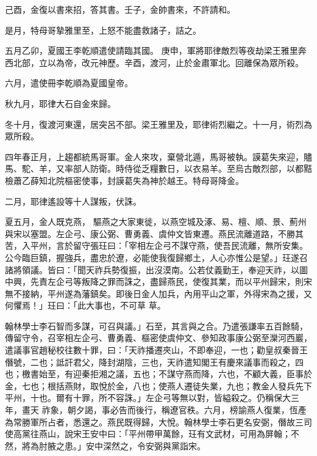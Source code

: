 \begin{pinyinscope}
 己酉，金復以書來招，答其書。壬子，金帥書來，不許請和。



 是月，特母哥摯雅里至，上怒不能盡救諸子，詰之。



 五月乙卯，夏國王李乾順遣使請臨其國。
 庚申，軍將耶律敵烈等夜劫梁王雅里奔西北部，立以為帝，改元神歷。辛酉，渡河，止於金肅軍北。回離保為眾所殺。



 六月，遣使冊李乾順為夏國皇帝。



 秋九月，耶律大石自金來歸。



 冬十月，復渡河東還，居突呂不部。梁王雅里及，耶律術烈繼之。十一月，術烈為眾所殺。



 四年春正月，上趨都統馬哥軍。金人來攻，棄營北遁，馬哥被執。謨葛失來迎，贐馬、駝、羊，又率部人防衛。時侍從乏糧數日，以衣易羊。至烏古敵烈部，以都黠檢蕭乙薛知北院樞密使事，封謨葛失為神於越王。特母哥降金。



 二月，耶律遙設等十人謀叛，伏誅。



 夏五月，金人既克燕，
 驅燕之大家東徙，以燕空城及涿、易、檀、順、景、薊州與宋以塞盟。左企弓、康公弼、曹勇義、虞仲文皆東遷。燕民流離道路，不勝其苦，入平州，言於留守張玨曰：「宰相左企弓不謀守燕，使吾民流離，無所安集。公今臨巨鎮，握強兵，盡忠於遼，必能使我復歸鄉土，人心亦惟公是望。」玨遂召諸將領議。皆曰：「聞天祚兵勢復振，出沒漠南。公若仗義勤王，奉迎天祚，以圖中興，先責左企弓等叛降之罪而誅之，盡歸燕民，使復其業，而以平州歸宋，則宋無不接納，平州遂為藩鎮矣。即後日金人加兵，內用平山之軍，外得宋為之援，又何懼焉！」玨曰：「此大事也，不可草
 草。



 翰林學士李石智而多謀，可召與議。」石至，其言與之合。乃遣張謙率五百餘騎，傳留守令，召宰相左企弓、曹勇義、樞密使虞仲文、參知政事康公弼至灤河西巖，遣議事官趙秘校往數十罪，曰：「天祚播遷夾山，不即奉迎，一也；勸皇叔秦晉王僭號，二也；詆訐君父，降封湖陰，三也，天祚遣知閣王有慶來議事而殺之，四也；檄書始至，有迎秦拒湘之議，五也；不謀守燕而降，六也，不顧大義，臣事於金，七也；根括燕財，取悅於金，八也；使燕人遷徒失業，九也；教金人發兵先下平州，十也。爾有十罪，所不容誅。」左企弓等無以對，皆縊殺之。仍稱保大三年，畫天
 祚象，朝夕謁，事必告而後行，稱遼官秩。六月，榜諭燕人復業，恆產為常勝軍所占者，悉還之。燕民既得歸，大悅。翰林學士李石更名安弼，僭故三司使高黨往燕山，說宋王安中曰：「平州帶甲萬餘，玨有文武材，可用為屏翰；不然，將為肘腋之患。」安中深然之，令安弼與黨詣宋。




\end{pinyinscope}
